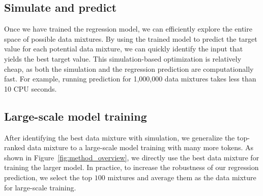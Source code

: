 \subsection{Simulate and predict}

Once we have trained the regression model, we can efficiently explore the entire space of possible data mixtures.
By using the trained model to predict the target value for each potential data mixture, we can quickly identify the input that yields the best target value. This simulation-based optimization is relatively cheap, as both the simulation and the regression prediction are computationally fast. For example, running prediction for 1,000,000 data mixtures takes less than 10 CPU seconds.

\subsection{Large-scale model training}

After identifying the best data mixture with simulation, we generalize the top-ranked data mixture to a large-scale model training with many more tokens.  As shown in Figure~\ref{fig:method_overview}, we directly use the best data mixture for training the larger model. In practice, to increase the robustness of our regression prediction, we select the top $100$ mixtures and average them as the data mixture for large-scale training. 
